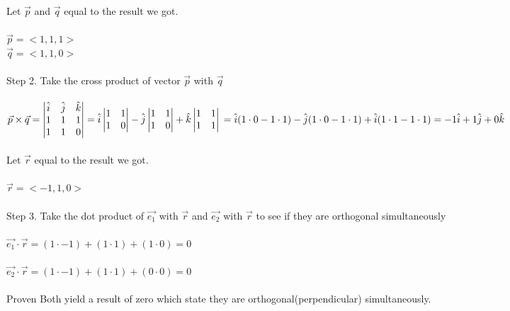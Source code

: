 \documentclass{article}
\begin{document}
\begin{enumerate}[4.]
	Let $\vec{p}$ and $\vec{q}$ equal to the result we got.\\
	\\
	$\vec{p}=<1,1,1>$
	\\
	$\vec{q}=<1,1,0>$\\
	\\
	Step 2. Take the cross product of vector $\vec{p}$ with $\vec{q}$\\
	\\
	$\vec{p}\times\vec{q}=\begin{vmatrix}
	\hat{i}&\hat{j}&\hat{k}\\
	1&1&1\\
	1&1&0\\
	\end{vmatrix}=\hat{i}
	\begin{vmatrix}
		1 & 1 \\
		1 & 0 \\
	\end{vmatrix}-\hat{j}\begin{vmatrix}
	1&1\\
	1&0\\
	\end{vmatrix}+\hat{k}\begin{vmatrix}
	1&1\\
	1&1\\
	\end{vmatrix}\\=\hat{i}(1\cdot0-1\cdot1)-\hat{j}(1\cdot0-1\cdot1)+\hat{i}(1\cdot1-1\cdot1)=-1\hat{i}+1\hat{j}+0\hat{k}$\\
	\\
	Let $\vec{r}$ equal to the result we got.\\
	\\
	$\vec{r} = <-1,1,0>$\\
	\\
	Step 3. Take the dot product of $\vec{e_{1}}$ with $\vec{r}$  and $\vec{e_{2}}$ with $\vec{r}$ to see if they are orthogonal simultaneously\\
	\\
	$\vec{e_{1}}\cdot\vec{r}=(1\cdot-1)+(1\cdot1)+(1\cdot0)=0$
	\\
	\\
	$\vec{e_{2}}\cdot\vec{r}=(1\cdot-1)+(1\cdot1)+(0\cdot0)=0$
	\\
	\\
	Proven Both yield a result of zero which state they are orthogonal(perpendicular) simultaneously.
\end{enumerate}
\end{document}
